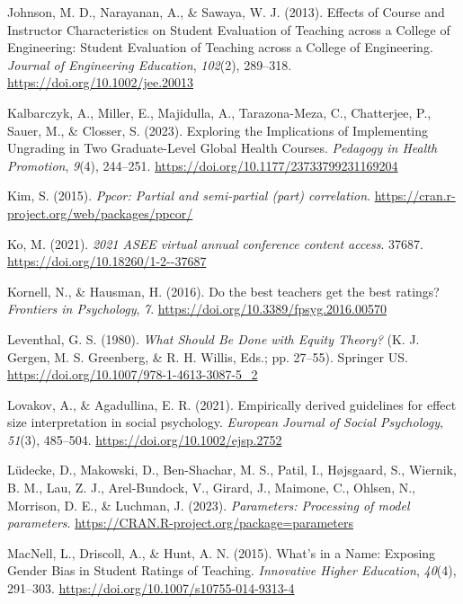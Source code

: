 \documentclass[
  man]{apa7}
\newlength{\cslhangindent}
\newenvironment{CSLReferences}[2] %
 {\begin{list}{}{%
  \setlength{\itemindent}{0pt}
  \setlength{\leftmargin}{0pt}
  \setlength{\parsep}{0pt}
  \ifodd #1
   \setlength{\leftmargin}{\cslhangindent}
   \setlength{\itemindent}{-1\cslhangindent}
  \fi
  \setlength{\itemsep}{#2\baselineskip}}}
 {\end{list}}
\begin{document}
\begin{CSLReferences}{1}{0}
Johnson, M. D., Narayanan, A., \& Sawaya, W. J. (2013). Effects of Course and Instructor Characteristics on Student Evaluation of Teaching across a College of Engineering: Student Evaluation of Teaching across a College of Engineering. \emph{Journal of Engineering Education}, \emph{102}(2), 289--318. \url{https://doi.org/10.1002/jee.20013}

Kalbarczyk, A., Miller, E., Majidulla, A., Tarazona-Meza, C., Chatterjee, P., Sauer, M., \& Closser, S. (2023). Exploring the Implications of Implementing Ungrading in Two Graduate-Level Global Health Courses. \emph{Pedagogy in Health Promotion}, \emph{9}(4), 244--251. \url{https://doi.org/10.1177/23733799231169204}

Kim, S. (2015). \emph{Ppcor: Partial and semi-partial (part) correlation}. \url{https://cran.r-project.org/web/packages/ppcor/}

Ko, M. (2021). \emph{2021 ASEE virtual annual conference content access}. 37687. \url{https://doi.org/10.18260/1-2--37687}

Kornell, N., \& Hausman, H. (2016). Do the best teachers get the best ratings? \emph{Frontiers in Psychology}, \emph{7}. \url{https://doi.org/10.3389/fpsyg.2016.00570}

Leventhal, G. S. (1980). \emph{What Should Be Done with Equity Theory?} (K. J. Gergen, M. S. Greenberg, \& R. H. Willis, Eds.; pp. 27--55). Springer US. \url{https://doi.org/10.1007/978-1-4613-3087-5_2}

Lovakov, A., \& Agadullina, E. R. (2021). Empirically derived guidelines for effect size interpretation in social psychology. \emph{European Journal of Social Psychology}, \emph{51}(3), 485--504. \url{https://doi.org/10.1002/ejsp.2752}

Lüdecke, D., Makowski, D., Ben-Shachar, M. S., Patil, I., Højsgaard, S., Wiernik, B. M., Lau, Z. J., Arel-Bundock, V., Girard, J., Maimone, C., Ohlsen, N., Morrison, D. E., \& Luchman, J. (2023). \emph{Parameters: Processing of model parameters}. \url{https://CRAN.R-project.org/package=parameters}

MacNell, L., Driscoll, A., \& Hunt, A. N. (2015). What{'}s in a Name: Exposing Gender Bias in Student Ratings of Teaching. \emph{Innovative Higher Education}, \emph{40}(4), 291--303. \url{https://doi.org/10.1007/s10755-014-9313-4}


\end{CSLReferences}
\end{document}
